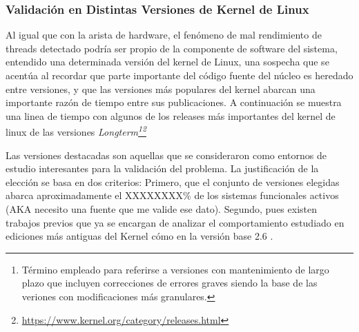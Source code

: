 \subsubsection{Validación en Distintas Versiones de Kernel de Linux}

Al igual que con la arista de hardware, el fenómeno de mal rendimiento de threads detectado podría ser propio de la componente de software del sistema, entendido  una determinada versión del kernel de Linux, una sospecha que se acentúa al recordar que parte importante del código fuente del núcleo es heredado entre versiones, y que las versiones más populares del kernel abarcan una importante razón de tiempo entre sus publicaciones. A continuación se muestra una linea de tiempo con algunos de los releases más importantes del kernel de linux de las versiones \emph{Longterm\footnote{Término empleado para referirse a versiones con mantenimiento de largo plazo que incluyen correcciones de errores graves siendo la base de las veriones con modificaciones más granulares.}\footnote{\url{https://www.kernel.org/category/releases.html}}}


\begin{center}
\end{center}

Las versiones destacadas son aquellas que se consideraron como entornos de estudio interesantes para la validación del problema. La justificación de la elección se basa en dos criterios: Primero, que el conjunto de versiones elegidas abarca aproximadamente el XXXXXXXX\% de los sistemas funcionales activos (AKA necesito una fuente que me valide ese dato). Segundo, pues existen trabajos previos que ya se encargan de analizar el comportamiento estudiado en ediciones más antiguas del Kernel cómo en la versión base 2.6 \cite{tesis:diegoDCC}.

